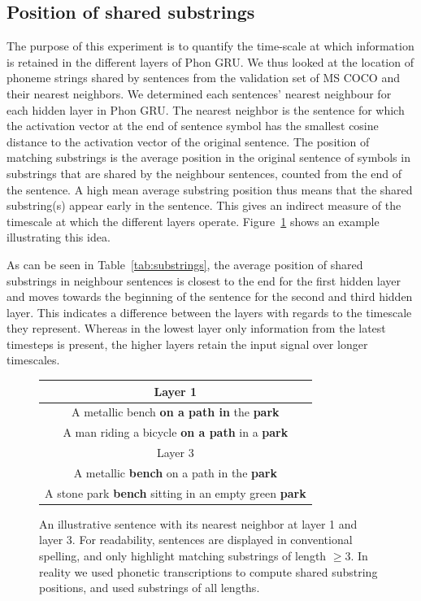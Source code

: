\subsection{Position of shared substrings}
The purpose of this experiment is to quantify the time-scale at which information is retained in the different layers of {\sc Phon GRU}. We thus looked at the location of phoneme strings shared by sentences from the validation set of MS COCO and their nearest neighbors. We determined each sentences' nearest neighbour for each hidden layer in {\sc Phon GRU}. The nearest neighbor is the sentence for which the activation vector at the end of sentence symbol has the smallest cosine distance to the activation vector of the original sentence. The position of matching substrings is the average position in the original sentence of symbols in substrings that are shared by the neighbour sentences, counted from the end of the sentence. A high mean average substring position thus means that the shared substring(s) appear early in the sentence. This gives an indirect measure of the timescale at which the different layers operate. Figure~\ref{fig:example-shared} shows an example illustrating this idea. 

As can be seen in Table~\ref{tab:substrings}, the average position of shared substrings in neighbour sentences is closest to the end for the first hidden layer and moves towards the beginning of the sentence for the second and third hidden layer. This indicates a difference between the layers with regards to the timescale they represent. Whereas in the lowest layer only information from the latest timesteps is present, the higher layers retain the input  signal over longer timescales.


\begin{figure}[h]
  \begin{tabular}{c}
    Layer 1 \\\hline
    A metallic bench {\bf on a path in} the {\bf park} \\
    A man riding a bicycle {\bf on a path} in a {\bf park} \\\hline
    Layer 3 \\\hline
    A metallic {\bf bench} on a path in the {\bf park} \\
    A stone park {\bf bench} sitting in an empty green {\bf park}\\ \hline
  \end{tabular}
  \caption{An illustrative sentence with its nearest neighbor at layer 1 and layer 3. For readability, sentences are displayed in conventional spelling, and only highlight matching substrings of length $\geq3$. In reality we used phonetic transcriptions to compute shared substring positions, and used substrings of all lengths. }
\label{fig:example-shared}
\end{figure}


